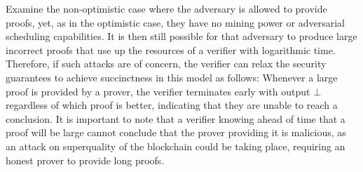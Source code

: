 \begin{remark}
Examine the non-optimistic case where the adversary is allowed to provide
proofs, yet, as in the optimistic case, they have no mining power or adversarial
scheduling capabilities. It is then still possible for that adversary to produce
large incorrect proofs that use up  the resources of a verifier with logarithmic
time. Therefore, if such attacks are of concern, the verifier can relax the
security guarantees to achieve succinctness in this model as follows: Whenever a
large proof is provided by a prover, the verifier terminates early with output
$\bot$ regardless of which proof is better, indicating that they are unable to
reach a conclusion. It is important to note that a verifier knowing ahead of
time that a proof will be large cannot conclude that the prover providing it is
malicious, as an attack on superquality of the blockchain could be taking place,
requiring an honest prover to provide long proofs.
\end{remark}
